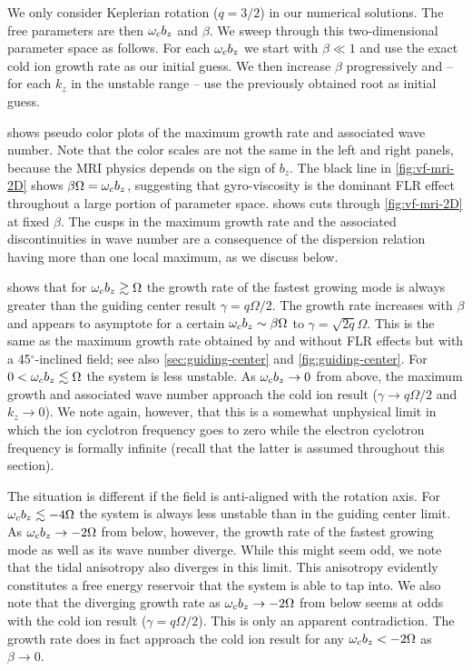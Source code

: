 \documentclass[aps,pre,notitlepage,amsmath,amssymb,amsfonts,nobibnotes,nofootinbib,superscriptaddress]{revtex4-1}
\begin{document}
We only consider Keplerian rotation ($q=3/2$) in our numerical solutions. The
free parameters are then $\omega_c{}b_z$ and $\beta$. We sweep through this
two-dimensional parameter space as follows. For each $\omega_c{}b_z$ we start with
$\beta\ll1$ and use the exact cold ion growth rate as our initial guess. We
then increase $\beta$ progressively and -- for each $k_z$ in the unstable
range -- use the previously obtained root as initial guess.

 shows pseudo color plots of the maximum growth rate and
associated wave number. Note that the color scales are not the same in the
left and right panels, because the MRI physics depends on the sign of $b_z$.
The black line in \cref{fig:vf-mri-2D} shows $\beta\Omega=\omega_c{}b_z$,
suggesting that gyro-viscosity is the dominant FLR effect throughout a large
portion of parameter space.  shows cuts through
\cref{fig:vf-mri-2D} at fixed $\beta$. The cusps in the maximum growth rate
and the associated discontinuities in wave number are a consequence of the
dispersion relation having more than one local maximum, as we discuss below.

 shows that for $\omega_c{}b_z\gtrsim\Omega$ the growth rate of
the fastest growing mode is always greater than the guiding center result
$\gamma=q\Omega/2$. The growth rate increases with $\beta$ and appears to
asymptote for a certain $\omega_c{}b_z\sim\beta\Omega$ to
$\gamma=\sqrt{2q}\Omega$. This is the same as the maximum growth rate obtained
by \citet{Quataert2002} and \citet{Balbus2004} without FLR effects but with a
45$^\circ$-inclined field; see also \cref{sec:guiding-center} and
\cref{fig:guiding-center}. For $0<\omega_c{}b_z\lesssim\Omega$ the system is less
unstable. As $\omega_c{}b_z\to0$ from above, the maximum growth and associated
wave number approach the cold ion result ($\gamma\to{}q\Omega/2$ and
$k_z\to0$). We note again, however, that this is a somewhat unphysical limit
in which the ion cyclotron frequency goes to zero while the electron cyclotron
frequency is formally infinite (recall that the latter is assumed throughout
this section).

The situation is different if the field is anti-aligned with the rotation
axis. For $\omega_c{}b_z\lesssim-4\Omega$ the system is always less unstable than
in the guiding center limit. As $\omega_c{}b_z\to-2\Omega$ from below, however,
the growth rate of the fastest growing mode as well as its wave number
diverge. While this might seem odd, we note that the tidal anisotropy also
diverges in this limit. This anisotropy evidently constitutes a free energy
reservoir that the system is able to tap into. We also note that the diverging
growth rate as $\omega_c{}b_z\to-2\Omega$ from below seems at odds with the cold
ion result ($\gamma=q\Omega/2$). This is only an apparent contradiction. The
growth rate does in fact approach the cold ion result for any
$\omega_c{}b_z<-2\Omega$ as $\beta\to0$.
\end{document}

